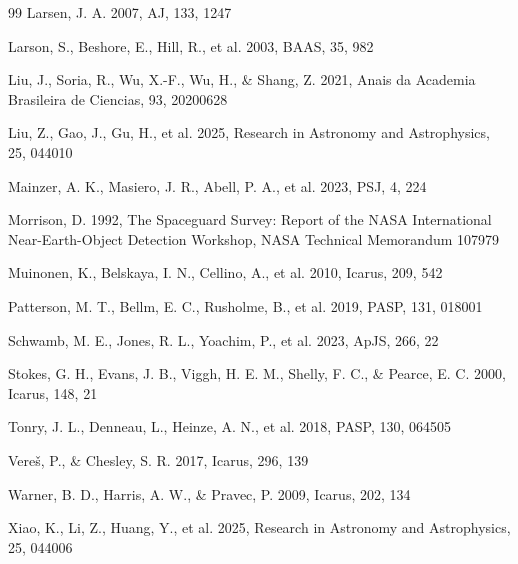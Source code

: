 \documentclass[referee]{raa}
\begin{document}
\begin{thebibliography}{99}
Larsen, J. A. 2007, AJ, 133, 1247

Larson, S., Beshore, E., Hill, R., et al. 2003, BAAS, 35, 982

Liu, J., Soria, R., Wu, X.-F., Wu, H., \& Shang, Z. 2021, Anais da Academia Brasileira de Ciencias, 93, 20200628

Liu, Z., Gao, J., Gu, H., et al. 2025, Research in Astronomy and Astrophysics, 25, 044010

Mainzer, A. K., Masiero, J. R., Abell, P. A., et al. 2023, PSJ, 4, 224

Morrison, D. 1992, The Spaceguard Survey: Report of the NASA International Near-Earth-Object Detection Workshop, NASA Technical Memorandum 107979

Muinonen, K., Belskaya, I. N., Cellino, A., et al. 2010, Icarus, 209, 542

Patterson, M. T., Bellm, E. C., Rusholme, B., et al. 2019, PASP, 131, 018001

Schwamb, M. E., Jones, R. L., Yoachim, P., et al. 2023, ApJS, 266, 22

Stokes, G. H., Evans, J. B., Viggh, H. E. M., Shelly, F. C., \& Pearce, E. C. 2000, Icarus, 148, 21

Tonry, J. L., Denneau, L., Heinze, A. N., et al. 2018, PASP, 130, 064505

Vere\v{s}, P., \& Chesley, S. R. 2017, Icarus, 296, 139

Warner, B. D., Harris, A. W., \& Pravec, P. 2009, Icarus, 202, 134

Xiao, K., Li, Z., Huang, Y., et al. 2025, Research in Astronomy and Astrophysics, 25, 044006

\end{thebibliography}
\end{document}
